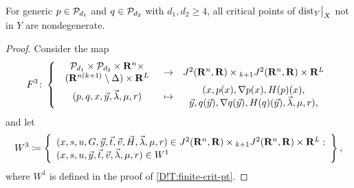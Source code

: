\begin{theorem}
\label{D!T:genericity-nondegeneracy}
  For generic $p \in \mathcal{P}_{d_1}$ and $q\in \mathcal{P}_{d_2}$ with $d_1, d_2 \geq 4$, all critical points of $\mathord{\operatorname{dist}}_Y\big|_X$ not in $Y$ are nondegenerate.
\end{theorem}

\begin{proof}
  Consider the map
  \[
    F^3 \colon \left\{ \begin{array}{ccc}
      \begin{array}{c}
        \mathcal{P}_{d_1} \times \mathcal{P}_{d_2} \times \mathbf{R}^n \times \\
        (\mathbf{R}^{n(k + 1)} \setminus \Delta) \times \mathbf{R}^L
      \end{array}
      & \to
      & J^2(\mathbf{R}^n, \mathbf{R}) \times {}_{k + 1} J^2(\mathbf{R}^n, \mathbf{R}) \times \mathbf{R}^L
    \\
      (p, q, x, \vec{y}, \vec{\lambda}, \mu, r)
      & \mapsto
      & \begin{array}{c}
        (x, p(x), \nabla p(x), H(p)(x), \\
        \vec{y}, q(\vec{y}), \nabla q(\vec{y}), H(q)(\vec{y}), \vec{\lambda}, \mu, r),
      \end{array}
    \end{array} \right.
  \]
  and let
  \[
    W^3 \coloneq \left\{ \begin{array}{l}
      (x, s, u, G, \vec{y}, \vec{t}, \vec{v}, \vec{H}, \vec{\lambda}, \mu, r) \in J^2(\mathbf{R}^n, \mathbf{R}) \times {}_{k + 1} J^2(\mathbf{R}^n, \mathbf{R}) \times \mathbf{R}^{L} : \\
      (x, s, u, \vec{y}, \vec{t}, \vec{v}, \vec{\lambda}, \mu, r) \in W^1
    \end{array} \right\},
  \]
  where $W^1$ is defined in the proof of \cref{D!T:finite-crit-pt}.


\end{proof}
